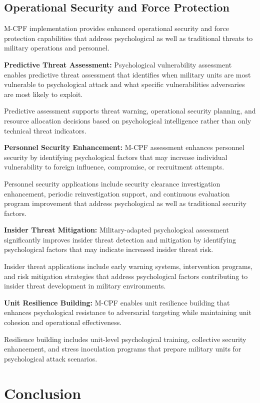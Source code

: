 \documentclass[10pt, twocolumn]{article}
\begin{document}
\subsection{Operational Security and Force Protection}

M-CPF implementation provides enhanced operational security and force protection capabilities that address psychological as well as traditional threats to military operations and personnel.

\textbf{Predictive Threat Assessment:} Psychological vulnerability assessment enables predictive threat assessment that identifies when military units are most vulnerable to psychological attack and what specific vulnerabilities adversaries are most likely to exploit.

Predictive assessment supports threat warning, operational security planning, and resource allocation decisions based on psychological intelligence rather than only technical threat indicators.

\textbf{Personnel Security Enhancement:} M-CPF assessment enhances personnel security by identifying psychological factors that may increase individual vulnerability to foreign influence, compromise, or recruitment attempts.

Personnel security applications include security clearance investigation enhancement, periodic reinvestigation support, and continuous evaluation program improvement that address psychological as well as traditional security factors.

\textbf{Insider Threat Mitigation:} Military-adapted psychological assessment significantly improves insider threat detection and mitigation by identifying psychological factors that may indicate increased insider threat risk.

Insider threat applications include early warning systems, intervention programs, and risk mitigation strategies that address psychological factors contributing to insider threat development in military environments.

\textbf{Unit Resilience Building:} M-CPF enables unit resilience building that enhances psychological resistance to adversarial targeting while maintaining unit cohesion and operational effectiveness.

Resilience building includes unit-level psychological training, collective security enhancement, and stress inoculation programs that prepare military units for psychological attack scenarios.

\section{Conclusion}
\end{document}
